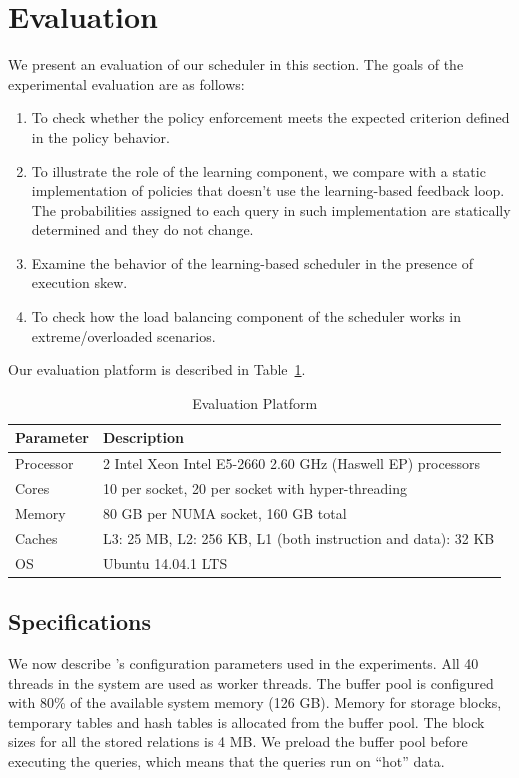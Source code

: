 \section{Evaluation}\label{sec:eval}
We present an evaluation of our scheduler in this section. 
The goals of the experimental evaluation are as follows:
\begin{enumerate}
\item To check whether the policy enforcement meets the expected criterion defined in 
the policy behavior. 
\item To illustrate the role of the learning component, we compare with a static implementation of policies that doesn't use the learning-based feedback loop. 
The probabilities assigned to each query in such implementation are statically determined and they do not change.
\item Examine the behavior of the learning-based scheduler in the presence of 
execution skew. 
\item To check how the load balancing component of the scheduler works in extreme/overloaded scenarios.
\end{enumerate}

Our evaluation platform is described in Table~\ref{table:hardware}.

\begin{table}[]
\centering
\begin{tabular}{|p{1cm}|p{6.9cm}|}
\hline
\textbf{Parameter} & \textbf{Description} \\ \hline
Processor & 2 Intel Xeon Intel E5-2660 2.60 GHz (Haswell EP) processors\\ \hline
Cores & 10 per socket, 20 per socket with hyper-threading \\ \hline
Memory & 80 GB per NUMA socket, 160 GB total \\ \hline
Caches & L3: 25 MB, L2: 256 KB, L1 (both instruction and data): 32 KB \\ \hline
OS & Ubuntu 14.04.1 LTS \\ \hline
\end{tabular}
\caption{Evaluation Platform}
\label{table:hardware}
\vspace{-2.5em}
\end{table}
\subsection{\sys{} Specifications}
We now describe \sys{}'s configuration parameters used in the experiments. 
All 40 threads in the system are used as worker threads.
The buffer pool is configured with 80\% of the available system memory (126 GB). 
Memory for storage blocks, temporary tables and hash tables is allocated from the buffer 
pool.
The block sizes for all the stored relations is 4 MB.
We preload the buffer pool before executing the queries, which means that the queries run on ``hot'' data. 


